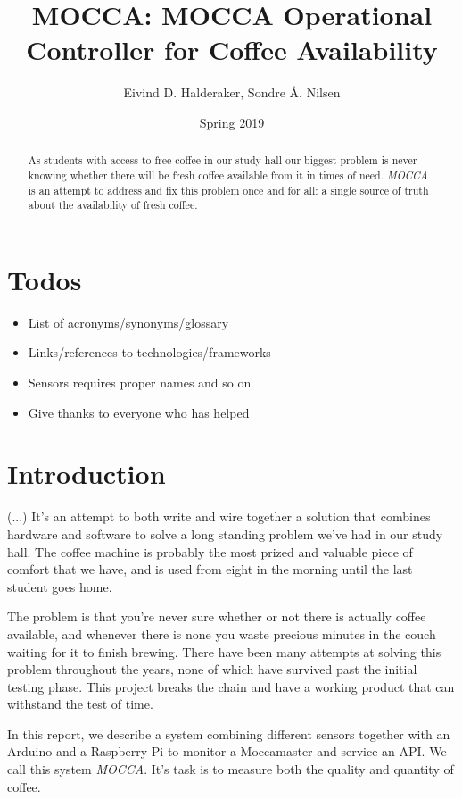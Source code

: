 \documentclass[12pt,a4paper,oneside,article]{memoir}
\title{MOCCA: MOCCA Operational Controller for Coffee Availability}
\author{Eivind D. Halderaker, Sondre Å. Nilsen}
\date{Spring 2019}
\numberwithin{equation}{chapter}
\begin{document}
\maketitle
\tableofcontents

\begin{abstract}
  As students with access to free coffee in our study hall our biggest problem
  is never knowing whether there will be fresh coffee available from it in times
  of need. \textit{MOCCA} is an attempt to address and fix this problem once and
  for all: a single source of truth about the availability of fresh coffee.
\end{abstract}

\section{Todos}
\begin{itemize}
\item List of acronyms/synonyms/glossary
\item Links/references to technologies/frameworks
\item Sensors requires proper names and so on
\item Give thanks to everyone who has helped
\end{itemize}

\section{Introduction}\label{sec:introduction}
(...) It's an attempt to both write and wire together a solution that combines 
hardware and software to solve a long
standing problem we've had in our study hall. The coffee machine is probably the
most prized and valuable piece of comfort that we have, and is used from eight
in the morning until the last student goes home.

The problem is that you're never sure whether or not there is actually
coffee available, and whenever there is none you waste precious minutes in the
couch waiting for it to finish brewing. There have been many attempts at solving
this problem throughout the years, none of which have survived past the initial
testing phase. This project breaks the chain and have a working product
that can withstand the test of time.

In this report, we describe a system combining different sensors together with 
an Arduino and a Raspberry Pi to monitor a Moccamaster and service 
an API. We call this system \textit{MOCCA}. It's task is to measure both the 
quality and quantity of coffee. 
\end{document}
